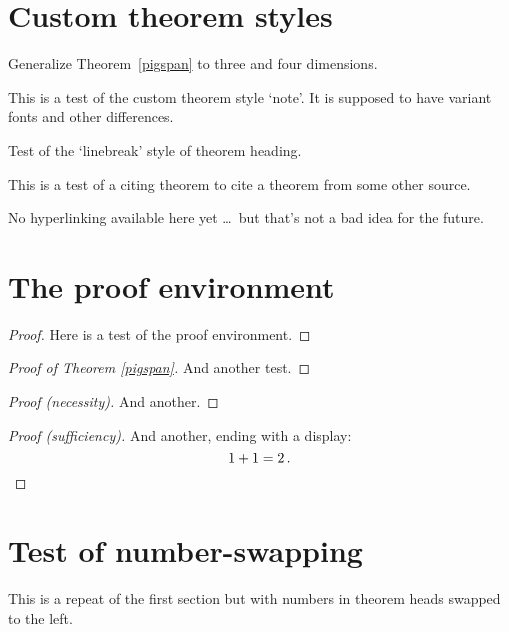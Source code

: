 \section{Custom theorem styles}

\begin{exer}
Generalize Theorem~\ref{pigspan} to three and four dimensions.
\end{exer}

\begin{note}
This is a test of the custom theorem style `note'. It is supposed to have
variant fonts and other differences.
\end{note}

\begin{bthm}
Test of the `linebreak' style of theorem heading.
\end{bthm}

This is a test of a citing theorem to cite a theorem from some other source.

\begin{varthm}
No hyperlinking available here yet \dots\ but that's not a
bad idea for the future.
\end{varthm}

\section{The proof environment}

\begin{proof}
Here is a test of the proof environment.
\end{proof}

\begin{proof}[Proof of Theorem \ref{pigspan}]
And another test.
\end{proof}

\begin{proof}[Proof \textup(necessity\textup)]
And another.
\end{proof}

\begin{proof}[Proof \textup(sufficiency\textup)]
And another, ending with a display:
\[
1+1=2\,. \qedhere
\]
\end{proof}

\section{Test of number-swapping}

This is a repeat of the first section but with numbers in theorem heads
swapped to the left.

